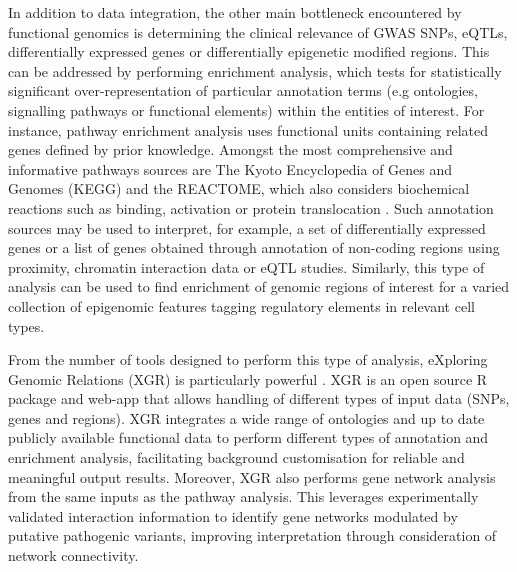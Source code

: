In addition to data integration, the other main bottleneck encountered by functional genomics is determining the clinical relevance of GWAS SNPs, eQTLs, differentially expressed genes or differentially epigenetic modified regions. This can be addressed by performing enrichment analysis, which tests for statistically significant over-representation of particular annotation terms (e.g ontologies, signalling pathways or functional elements) within the entities of interest. For instance, pathway enrichment analysis uses functional units containing related genes defined by prior knowledge. Amongst the most comprehensive and informative pathways sources are The Kyoto Encyclopedia of Genes and Genomes (KEGG) and the REACTOME, which also considers biochemical reactions such as binding, activation or protein translocation \parencite{Kanehisa2000, Fabregat2018}. Such annotation sources may be used to interpret, for example, a set of differentially expressed genes or a list of genes obtained through annotation of non-coding regions using proximity, chromatin interaction data or eQTL studies. Similarly, this type of analysis can be used to find enrichment of genomic regions of interest for a varied collection of epigenomic features tagging regulatory elements in relevant cell types.%

From the number of tools designed to perform this type of analysis, eXploring Genomic Relations (XGR) is particularly powerful \parencite{Fang2016}. XGR is an open source R package and web-app that allows handling of different types of input data (SNPs, genes and regions). XGR integrates a wide range of ontologies and up to date publicly available functional data to perform different types of annotation and enrichment analysis, facilitating background customisation for reliable and meaningful output results. Moreover, XGR also performs gene network analysis from the same inputs as the pathway analysis. This leverages experimentally validated interaction information to identify gene networks modulated by putative pathogenic variants, improving interpretation through consideration of network connectivity.




